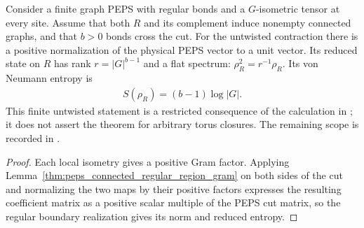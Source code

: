 \begin{theorem}%
    \label{thm:peps_connected_untwisted_cut_entropy}
    \leanok
    Consider a finite graph PEPS with regular bonds and a $G$-isometric
    tensor at every site. Assume that both $R$ and its complement
    induce nonempty connected graphs, and that $b>0$ bonds cross the cut.
    For the untwisted contraction there is a positive normalization of
    the physical PEPS vector to a unit vector. Its reduced state
    on $R$ has rank $r=|G|^{b-1}$ and a flat spectrum:
    $\rho_R^2=r^{-1}\rho_R$. Its von Neumann entropy is
    \begin{align}
        S(\rho_R)=(b-1)\log|G|.
    \end{align}
    This finite untwisted statement is a restricted consequence of the
    calculation in \cite[Theorem~6.9]{Schuch2010PEPS}; it does not assert
    the theorem for arbitrary torus closures. The remaining scope is
    recorded in \cite{gap:rmp_peps_quantum_double_g_isometry}.
\end{theorem}
\begin{proof}\leanok
    Each local isometry gives a positive Gram factor. Applying
    Lemma~\ref{thm:peps_connected_regular_region_gram} on both sides
    of the cut and normalizing the two maps by their positive factors
    expresses the resulting coefficient matrix as a positive scalar multiple of
    the PEPS cut matrix, so the regular boundary realization gives
    its norm and reduced entropy.
\end{proof}

